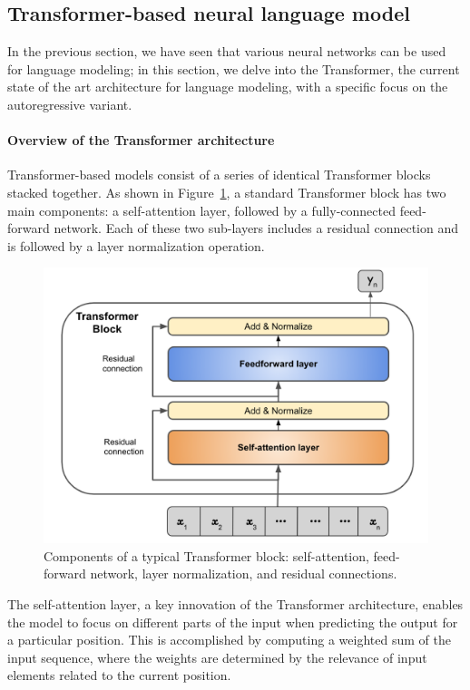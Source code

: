 \subsection{Transformer-based neural language model}\label{sec:auto_transformer}
In the previous section, we have seen that various neural networks can be used for language modeling; in this section, we delve into the Transformer, the current state of the art architecture for language modeling, with a specific focus on the autoregressive variant.

\paragraph{Overview of the Transformer architecture}
Transformer-based models consist of a series of identical Transformer blocks stacked together. As shown in Figure~\ref{fig:transformer_layer}, a standard Transformer block has two main components: a self-attention layer, followed by a fully-connected feed-forward network. Each of these two sub-layers includes a residual connection and is followed by a layer normalization operation.

\begin{figure}[ht]
    \centering
    \includegraphics[scale=0.36]{figures/Transformer_layer.png}
    \caption{Components of a typical Transformer block: self-attention, feed-forward network, layer normalization, and residual connections. }
    \label{fig:transformer_layer}
\end{figure}
The self-attention layer, a key innovation of the Transformer architecture, enables the model to focus on different parts of the input when predicting the output for a particular position. This is accomplished by computing a weighted sum of the input sequence, where the weights are determined by the relevance 
of input elements related to the current position.

